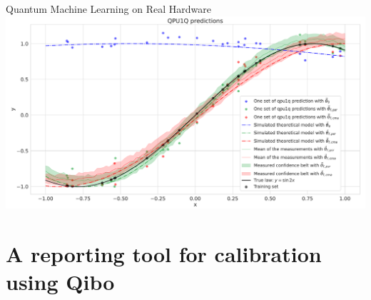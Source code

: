 \documentclass[11pt]{beamer}
\begin{document}
\begin{frame}{Quantum Machine Learning on Real Hardware}
\includegraphics[width=\textwidth]{figures/cropped_qpu_not_normed..pdf}
\end{frame}



\section{A reporting tool for calibration using Qibo}
\end{document}
